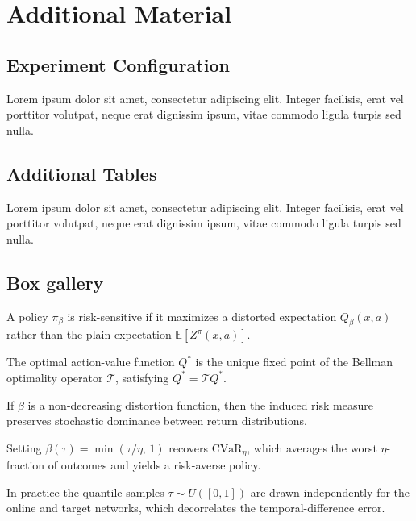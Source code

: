 \chapter{Additional Material}

\section{Experiment Configuration}
Lorem ipsum dolor sit amet, consectetur adipiscing elit. Integer facilisis,
erat vel porttitor volutpat, neque erat dignissim ipsum, vitae commodo ligula
turpis sed nulla.

\section{Additional Tables}
Lorem ipsum dolor sit amet, consectetur adipiscing elit. Integer facilisis,
erat vel porttitor volutpat, neque erat dignissim ipsum, vitae commodo ligula
turpis sed nulla.

\section{Box gallery}
\begin{definition}
A policy $\pi_\beta$ is risk-sensitive if it maximizes a distorted expectation
$Q_\beta(x,a)$ rather than the plain expectation $\mathbb{E}[Z^\pi(x,a)]$.
\end{definition}

\begin{theorem}
The optimal action-value function $Q^*$ is the unique fixed point of the Bellman
optimality operator $\mathcal{T}$, satisfying $Q^* = \mathcal{T}Q^*$.
\end{theorem}

\begin{proposition}
If $\beta$ is a non-decreasing distortion function, then the induced risk measure
preserves stochastic dominance between return distributions.
\end{proposition}

\begin{example}
Setting $\beta(\tau) = \min(\tau/\eta,\, 1)$ recovers $\mathrm{CVaR}_\eta$, which
averages the worst $\eta$-fraction of outcomes and yields a risk-averse policy.
\end{example}

\begin{remark}
In practice the quantile samples $\tau \sim U([0,1])$ are drawn independently for
the online and target networks, which decorrelates the temporal-difference error.
\end{remark}